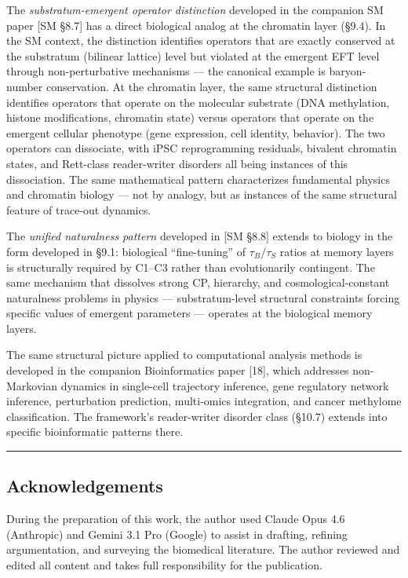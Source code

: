 \documentclass[
]{article}
\begin{document}
The \emph{substratum-emergent operator distinction} developed in the
companion SM paper {[}SM §8.7{]} has a direct biological analog at the
chromatin layer (§9.4). In the SM context, the distinction identifies
operators that are exactly conserved at the substratum (bilinear
lattice) level but violated at the emergent EFT level through
non-perturbative mechanisms --- the canonical example is baryon-number
conservation. At the chromatin layer, the same structural distinction
identifies operators that operate on the molecular substrate (DNA
methylation, histone modifications, chromatin state) versus operators
that operate on the emergent cellular phenotype (gene expression, cell
identity, behavior). The two operators can dissociate, with iPSC
reprogramming residuals, bivalent chromatin states, and Rett-class
reader-writer disorders all being instances of this dissociation. The
same mathematical pattern characterizes fundamental physics and
chromatin biology --- not by analogy, but as instances of the same
structural feature of trace-out dynamics.

The \emph{unified naturalness pattern} developed in {[}SM §8.8{]}
extends to biology in the form developed in §9.1: biological
``fine-tuning'' of \(\tau_B / \tau_S\) ratios at memory layers is
structurally required by C1--C3 rather than evolutionarily contingent.
The same mechanism that dissolves strong CP, hierarchy, and
cosmological-constant naturalness problems in physics ---
substratum-level structural constraints forcing specific values of
emergent parameters --- operates at the biological memory layers.

The same structural picture applied to computational analysis methods is
developed in the companion Bioinformatics paper {[}18{]}, which
addresses non-Markovian dynamics in single-cell trajectory inference,
gene regulatory network inference, perturbation prediction, multi-omics
integration, and cancer methylome classification. The framework's
reader-writer disorder class (§10.7) extends into specific bioinformatic
patterns there.

\begin{center}\rule{0.5\linewidth}{0.5pt}\end{center}

\hypertarget{acknowledgements}{%
\subsection{Acknowledgements}\label{acknowledgements}}

During the preparation of this work, the author used Claude Opus 4.6
(Anthropic) and Gemini 3.1 Pro (Google) to assist in drafting, refining
argumentation, and surveying the biomedical literature. The author
reviewed and edited all content and takes full responsibility for the
publication.
\end{document}
